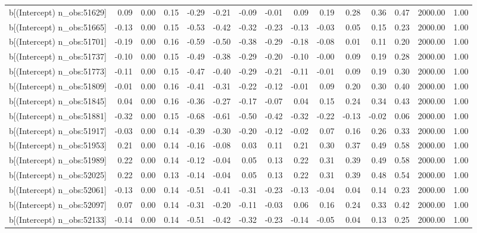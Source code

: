 \begin{table}[ht]
\begin{tabular}{rrrrrrrrrrrrrrr}
  b[(Intercept) n\_obs:51629] & 0.09 & 0.00 & 0.15 & -0.29 & -0.21 & -0.09 & -0.01 & 0.09 & 0.19 & 0.28 & 0.36 & 0.47 & 2000.00 & 1.00 \\ 
  b[(Intercept) n\_obs:51665] & -0.13 & 0.00 & 0.15 & -0.53 & -0.42 & -0.32 & -0.23 & -0.13 & -0.03 & 0.05 & 0.15 & 0.23 & 2000.00 & 1.00 \\ 
  b[(Intercept) n\_obs:51701] & -0.19 & 0.00 & 0.16 & -0.59 & -0.50 & -0.38 & -0.29 & -0.18 & -0.08 & 0.01 & 0.11 & 0.20 & 2000.00 & 1.00 \\ 
  b[(Intercept) n\_obs:51737] & -0.10 & 0.00 & 0.15 & -0.49 & -0.38 & -0.29 & -0.20 & -0.10 & -0.00 & 0.09 & 0.19 & 0.28 & 2000.00 & 1.00 \\ 
  b[(Intercept) n\_obs:51773] & -0.11 & 0.00 & 0.15 & -0.47 & -0.40 & -0.29 & -0.21 & -0.11 & -0.01 & 0.09 & 0.19 & 0.30 & 2000.00 & 1.00 \\ 
  b[(Intercept) n\_obs:51809] & -0.01 & 0.00 & 0.16 & -0.41 & -0.31 & -0.22 & -0.12 & -0.01 & 0.09 & 0.20 & 0.30 & 0.40 & 2000.00 & 1.00 \\ 
  b[(Intercept) n\_obs:51845] & 0.04 & 0.00 & 0.16 & -0.36 & -0.27 & -0.17 & -0.07 & 0.04 & 0.15 & 0.24 & 0.34 & 0.43 & 2000.00 & 1.00 \\ 
  b[(Intercept) n\_obs:51881] & -0.32 & 0.00 & 0.15 & -0.68 & -0.61 & -0.50 & -0.42 & -0.32 & -0.22 & -0.13 & -0.02 & 0.06 & 2000.00 & 1.00 \\ 
  b[(Intercept) n\_obs:51917] & -0.03 & 0.00 & 0.14 & -0.39 & -0.30 & -0.20 & -0.12 & -0.02 & 0.07 & 0.16 & 0.26 & 0.33 & 2000.00 & 1.00 \\ 
  b[(Intercept) n\_obs:51953] & 0.21 & 0.00 & 0.14 & -0.16 & -0.08 & 0.03 & 0.11 & 0.21 & 0.30 & 0.37 & 0.49 & 0.58 & 2000.00 & 1.00 \\ 
  b[(Intercept) n\_obs:51989] & 0.22 & 0.00 & 0.14 & -0.12 & -0.04 & 0.05 & 0.13 & 0.22 & 0.31 & 0.39 & 0.49 & 0.58 & 2000.00 & 1.00 \\ 
  b[(Intercept) n\_obs:52025] & 0.22 & 0.00 & 0.13 & -0.14 & -0.04 & 0.05 & 0.13 & 0.22 & 0.31 & 0.39 & 0.48 & 0.54 & 2000.00 & 1.00 \\ 
  b[(Intercept) n\_obs:52061] & -0.13 & 0.00 & 0.14 & -0.51 & -0.41 & -0.31 & -0.23 & -0.13 & -0.04 & 0.04 & 0.14 & 0.23 & 2000.00 & 1.00 \\ 
  b[(Intercept) n\_obs:52097] & 0.07 & 0.00 & 0.14 & -0.31 & -0.20 & -0.11 & -0.03 & 0.06 & 0.16 & 0.24 & 0.33 & 0.42 & 2000.00 & 1.00 \\ 
  b[(Intercept) n\_obs:52133] & -0.14 & 0.00 & 0.14 & -0.51 & -0.42 & -0.32 & -0.23 & -0.14 & -0.05 & 0.04 & 0.13 & 0.25 & 2000.00 & 1.00 \\ 

\end{tabular}
\end{table}
